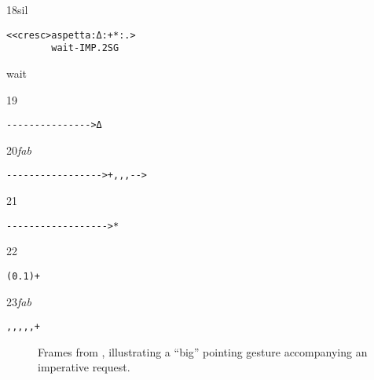 \documentclass[output=paper,modfonts]{langscibook}
\begin{document}
%
\begin{mdframednoverticalspace}[style=secondfoc]
\begin{transbox}{18}{sil}
\begin{verbatim}
<<cresc>aspetta:Δ:+*:.>
        wait-IMP.2SG
\end{verbatim}
\hspace{1.1cm} wait
\end{transbox}
\end{mdframednoverticalspace}\vspace{2mm}
%
\begin{transbox}{19}{~}
\begin{verbatim}
--------------->Δ
\end{verbatim}
\end{transbox}
%
\begin{transbox}{20}{\textit{fab}}
\begin{verbatim}
----------------->+,,,-->
\end{verbatim}
\end{transbox}
%
\begin{transbox}{21}{~}
\begin{verbatim}
------------------>*
\end{verbatim}
\end{transbox}
%
\begin{transbox}{22}{~}
\begin{verbatim}
(0.1)+
\end{verbatim}
\end{transbox}\vspace{-1.5mm}
%
\begin{transbox}{23}{\textit{fab}}
\begin{verbatim}
,,,,,+
\end{verbatim}
\end{transbox}\bigskip

\begin{figure}
\caption{Frames from , illustrating a “big” pointing gesture accompanying an imperative request.}
\label{fig:rossi:4}
\end{figure}
\end{document}
